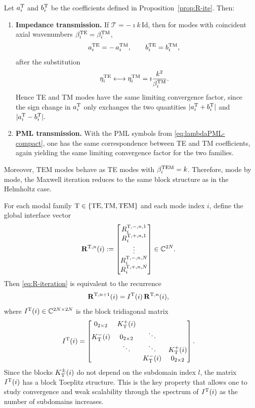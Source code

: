 \documentclass[smallextended]{svjour3}       %
\begin{document}
\begin{corollary}\label{cor:MH-dictionary}
Let \(a_i^{\rm T}\) and \(b_i^{\rm T}\) be the coefficients defined in Proposition~\ref{prop:R-ite}. Then:
\begin{enumerate}
\item[(a)] \textbf{Impedance transmission.} If \(\mathcal T=-\imath k\,\mathrm{Id}\), then for modes with coincident axial wavenumbers \(\beta_i^{\rm TE}=\beta_i^{\rm TM}\),
\[
a_i^{\rm TE}
=
-\,a_i^{\rm TM},
\qquad
b_i^{\rm TE}
=
b_i^{\rm TM},
\]
after the substitution
\[
\eta_i^{\rm TE}
\longleftrightarrow
\eta_i^{\rm TM}
=
\imath \frac{k^2}{\beta_i^{\rm TM}}.
\]
Hence TE and TM modes have the same limiting convergence factor, since the sign change in \(a_i^{\rm T}\) only exchanges the two quantities
\(
|a_i^{\rm T}+b_i^{\rm T}|
\)
and
\(
|a_i^{\rm T}-b_i^{\rm T}|.
\)

\item[(b)] \textbf{PML transmission.} With the PML symbols from \eqref{eq:lambdaPML-compact}, one has the same correspondence between TE and TM coefficients, again yielding the same limiting convergence factor for the two families.
\end{enumerate}
Moreover, TEM modes behave as TE modes with \(\beta_i^{\rm TEM}=k\). Therefore, mode by mode, the Maxwell iteration reduces to the same block structure as in the Helmholtz case.
\end{corollary}

For each modal family \({\rm T}\in\{{\rm TE,TM,TEM}\}\) and each mode index \(i\), define the global interface vector
\[
\mathbf R^{{\rm T},n}(i)
:=
\begin{bmatrix}
R_i^{{\rm T},-,n,1}\\
R_i^{{\rm T},+,n,1}\\
\vdots\\
R_i^{{\rm T},-,n,N}\\
R_i^{{\rm T},+,n,N}
\end{bmatrix}
\in \mathbb C^{2N}.
\]
Then \eqref{eq:R-iteration} is equivalent to the recurrence
\[
\mathbf R^{{\rm T},n+1}(i)
=
I^{\rm T}(i)\,\mathbf R^{{\rm T},n}(i),
\]
where \(I^{\rm T}(i)\in\mathbb C^{2N\times 2N}\) is the block tridiagonal matrix
\[
I^{\rm T}(i)
=
\begin{bmatrix}
0_{2\times2} & K_{\rm T}^+(i) &        &        \\
K_{\rm T}^-(i) & 0_{2\times2} & \ddots &        \\
        & \ddots & \ddots & K_{\rm T}^+(i) \\
        &        & K_{\rm T}^-(i) & 0_{2\times2}
\end{bmatrix}.
\]
Since the blocks \(K_{\rm T}^\pm(i)\) do not depend on the subdomain index \(l\), the matrix \(I^{\rm T}(i)\) has a block Toeplitz structure. This is the key property that allows one to study convergence and weak scalability through the spectrum of \(I^{\rm T}(i)\) as the number of subdomains increases.
\end{document}
